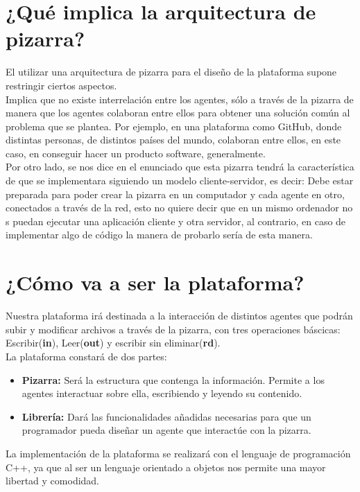 \section{¿Qué implica la arquitectura de pizarra?}
El utilizar una arquitectura de pizarra para el diseño de la plataforma supone restringir ciertos aspectos.\\

Implica que no existe interrelación entre los agentes, sólo a través de la pizarra de manera que los agentes colaboran entre ellos para obtener una solución común al problema que se plantea. Por ejemplo, en una plataforma como GitHub, donde distintas personas, de distintos países del mundo, colaboran entre ellos, en este caso, en conseguir hacer un producto software, generalmente.\\

Por otro lado, se nos dice en el enunciado que esta pizarra tendrá la característica de que se implementara siguiendo un modelo cliente-servidor, es decir: Debe estar preparada para poder crear la pizarra en un computador y cada agente en otro, conectados a través de la red, esto no quiere decir que en un mismo ordenador no s puedan ejecutar una aplicación cliente y otra servidor, al contrario, en caso de implementar algo de código la manera de probarlo sería de esta manera.

\section{¿Cómo va a ser la plataforma?}
Nuestra plataforma irá destinada a la interacción de distintos agentes que podrán subir y modificar archivos a través de la pizarra, con tres operaciones báscicas: Escribir(\textbf{in}), Leer(\textbf{out}) y escribir sin eliminar(\textbf{rd}).\\

La plataforma constará de dos partes:
\begin{itemize}
	\item \textbf{Pizarra: }Será la estructura que contenga la información. Permite a los agentes interactuar sobre ella, escribiendo y leyendo su contenido.
	\item \textbf{Librería: }Dará las funcionalidades añadidas necesarias para que un programador pueda diseñar un agente que interactúe con la pizarra. 
\end{itemize}

La implementación de la plataforma se realizará con el lenguaje de programación C++, ya que al ser un lenguaje orientado a objetos nos permite una mayor libertad y comodidad.
